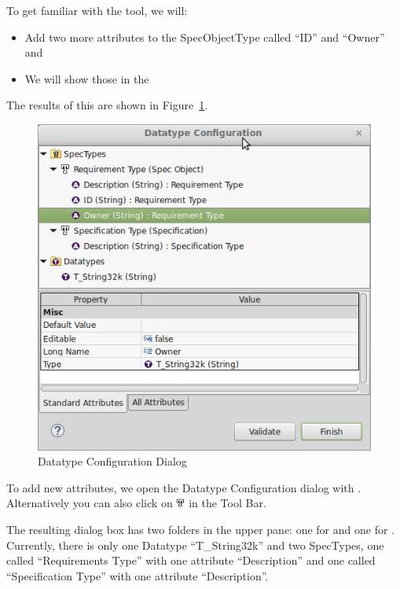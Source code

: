 To get familiar with the tool, we will:

\begin{itemize}
\item
  Add two more attributes to the SpecObjectType called ``ID'' and ``Owner'' and
\item
  We will show those  in the 
\end{itemize}

The results of this are shown in Figure~\ref{fig:datatype_configuration}.

\begin{figure}
\centering
\includegraphics[width=0.8\linewidth]{../rmf-images/datatype.png}
\caption{Datatype Configuration Dialog}
\label{fig:datatype_configuration}
\end{figure}

To add new attributes, we open the Datatype Configuration dialog with .  Alternatively you can also click on \includegraphics[height=0.8em]{../rmf-images/icons/full/obj16/SpecType.png} in the Tool Bar.

The resulting dialog box has two folders in the upper pane: one for  and one for .  Currently, there is only one Datatype ``T\_String32k'' and two SpecTypes, one called ``Requirements Type'' with one attribute ``Description'' and one called ``Specification Type'' with one attribute ``Description''.

